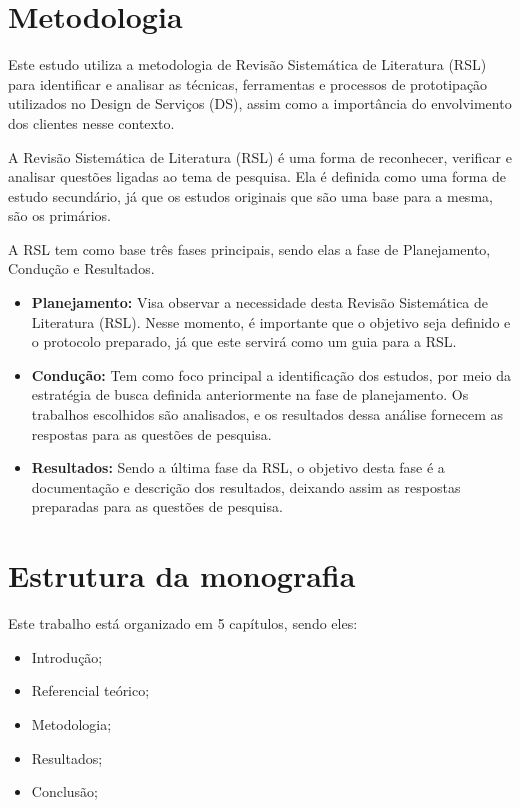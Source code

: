 \section{Metodologia}

Este estudo utiliza a metodologia de Revisão Sistemática de Literatura (RSL) para identificar e analisar as técnicas, ferramentas e processos de prototipação utilizados no Design de Serviços (DS), assim como a importância do envolvimento dos clientes nesse contexto. 

A Revisão Sistemática de Literatura (RSL) é uma forma de reconhecer, verificar e analisar questões ligadas ao tema de pesquisa. Ela é definida como uma forma de estudo secundário, já que os estudos originais que são uma base para a mesma, são os primários. 

A RSL tem como base três fases principais, sendo elas a fase de Planejamento, Condução e Resultados. 

\begin{itemize} 
	\item \textbf{Planejamento:} Visa observar a necessidade desta Revisão Sistemática de Literatura (RSL). Nesse momento, é importante que o objetivo seja definido e o protocolo preparado, já que este servirá como um guia para a RSL. 
	
	\item \textbf{Condução:} Tem como foco principal a identificação dos estudos, por meio da estratégia de busca definida anteriormente na fase de planejamento. Os trabalhos escolhidos são analisados, e os resultados dessa análise fornecem as respostas para as questões de pesquisa. 
	
	\item \textbf{Resultados:} Sendo a última fase da RSL, o objetivo desta fase é a documentação e descrição dos resultados, deixando assim as respostas preparadas para as questões de pesquisa.
	
\end{itemize}


\section{Estrutura da monografia}

Este trabalho está organizado em 5 capítulos, sendo eles:

\begin{itemize}
	\item Introdução;
	
	\item Referencial teórico;
	
	\item Metodologia;
	
	\item Resultados;
	
	\item Conclusão;
\end{itemize}
